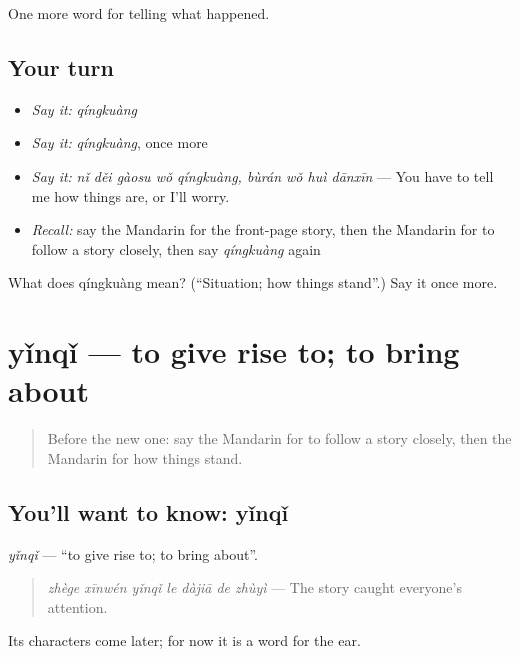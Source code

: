 \begin{grammarlens}[title={What you've built}]
One more word for telling what happened.
\end{grammarlens}

\subsection*{Your turn}
\begin{itemize}
\raggedright
  \item \emph{Say it:} \emph{qíngkuàng}
  \item \emph{Say it:} \emph{qíngkuàng}, once more
  \item \emph{Say it:} \emph{nǐ děi gàosu wǒ qíngkuàng, bùrán wǒ huì dānxīn} — You have to tell me how things are, or I'll worry.
  \item \emph{Recall:} say the Mandarin for the front-page story, then the Mandarin for to follow a story closely, then say \emph{qíngkuàng} again
\end{itemize}

\begin{tcolorbox}[breakable,colback=teal!4,colframe=teal!35!black,title={Before you move on}]
What does qíngkuàng mean? (\textquotedblleft{}Situation; how things stand\textquotedblright{}.) Say it once more.
\end{tcolorbox}
\section[yǐnqǐ]{yǐnqǐ — to give rise to; to bring about}

\label{lesson:ZH-C294-yinqi}



\begin{quote}
Before the new one: say the Mandarin for to follow a story closely, then the Mandarin for how things stand.
\end{quote}

\subsection*{You'll want to know: yǐnqǐ}
\emph{yǐnqǐ} — \textquotedblleft{}to give rise to; to bring about\textquotedblright{}.

\begin{quote}
\emph{zhège xīnwén yǐnqǐ le dàjiā de zhùyì} — The story caught everyone's attention.
\end{quote}

Its characters come later; for now it is a word for the ear.

